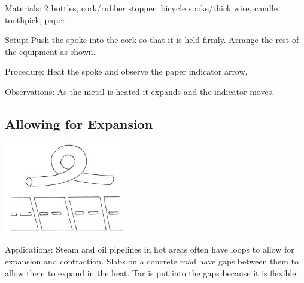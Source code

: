 \begin{multicols}{2}
\begin{description*}
\item[Materials:]{2 bottles, cork/rubber stopper, bicycle spoke/thick wire, candle, toothpick, paper}
\item[Setup:]{Push the spoke into the cork so that it is held firmly. Arrange the rest of the equipment as shown.}
\item[Procedure:]{Heat the spoke and observe the paper indicator arrow.}
\item[Observations:]{As the metal is heated it expands and the indicator moves.}
\end{description*}

\subsection{Allowing for Expansion}

\begin{center}
\includegraphics[width=0.4\textwidth]{./img/vso/allowing-expansion.png}
\end{center}

\begin{description*}
\item[Applications:]{Steam and oil pipelines in hot areas often have loops to allow for expansion and contraction. Slabs on a concrete road have gaps between them to allow them to expand in the heat. Tar is put into the gaps because it is flexible.}
\end{description*}


\end{multicols}

